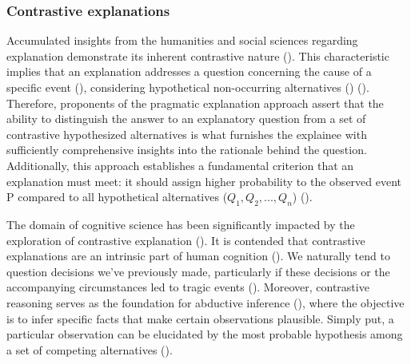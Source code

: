 \documentclass[binding=0.6cm]{sapthesis}
\newcommand{\mycite}[1]{(\cite{#1})}
\begin{document}
\subsubsection{Contrastive explanations}
\label{sec:bg.xai.contrastive}
Accumulated insights from the humanities and social sciences regarding explanation demonstrate its inherent contrastive nature \mycite{miller2019-xai-insights}. This characteristic implies that an explanation addresses a  question concerning the cause of a specific event (), considering hypothetical non-occurring alternatives () \mycite{lipton1990-LIPCE}. Therefore, proponents of the pragmatic explanation approach assert that the ability to distinguish the answer to an explanatory question from a set of contrastive hypothesized alternatives is what furnishes the explainee with sufficiently comprehensive insights into the rationale behind the question. Additionally, this approach establishes a fundamental criterion that an explanation must meet: it should assign higher probability to the observed event P compared to all hypothetical alternatives ($Q_1, Q_2, ..., Q_n$) \mycite{sormo2005-cased-based}.

The domain of cognitive science has been significantly impacted by the exploration of contrastive explanation \mycite{roese1997-cf-thinking,chinParker2017-ACA}. It is contended that contrastive explanations are an intrinsic part of human cognition \mycite{byrne2002-mental-models}. We naturally tend to question decisions we've previously made, particularly if these decisions or the accompanying circumstances led to tragic events \mycite{wenzlhuemer2009-cf-scientific}. Moreover, contrastive reasoning serves as the foundation for abductive inference \mycite{folger2016-abduction101}, where the objective is to infer specific facts that make certain observations plausible. Simply put, a particular observation can be elucidated by the most probable hypothesis among a set of competing alternatives \mycite{rappaport1996-inf-best}.
\end{document}
